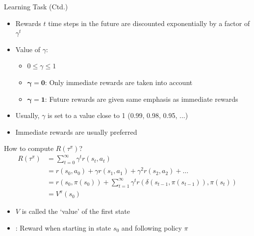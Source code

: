 \begin{frame}{Learning Task (Ctd.)}{}
	\begin{itemize}
		\item Rewards $t$ time steps in the future are discounted exponentially by a factor of $\gamma^t$
		\item Value of $\gamma$:
		\begin{itemize}
			\item $0 \le \gamma \le 1$
			\item $\bm{\gamma = 0}$: Only immediate rewards are taken into account
			\item $\bm{\gamma = 1}$: Future rewards are given same emphasis as immediate rewards
		\end{itemize}
		\item Usually, $\gamma$ is set to a value close to 1 (0.99, 0.98, 0.95, ...)
		\item Immediate rewards are usually preferred
	\end{itemize}
\end{frame}


\begin{frame}{How to compute $R(\tau^{\pi})$?}{}
	\vspace*{-8mm}
	\begin{align*}
		R(\tau^{\pi}) 	&= \sum_{t=0}^{\infty} \gamma^t r(s_t, a_t) \\
						&= r(s_0, a_0) + \gamma r(s_1, a_1) + \gamma^2 r(s_2, a_2) + \dots \\
						&= r(s_0, \pi(s_0)) + \sum_{t=1}^{\infty} \gamma^t r(\delta(s_{t-1}, \pi(s_{t-1})), \pi(s_t)) \\
						&= V^{\pi}(s_0)
	\end{align*}

	\vspace*{-2mm}
	\begin{itemize}
		\item $V$ is called the `value' of the first state
		\item {}: Reward when starting in state $s_0$ and following policy $\pi$
	\end{itemize}
\end{frame}


